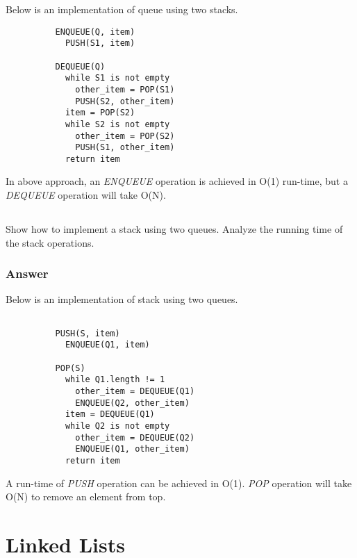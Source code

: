         Below is an implementation of queue using two stacks.

        \begin{verbatim}
          ENQUEUE(Q, item)
            PUSH(S1, item)

          DEQUEUE(Q)
            while S1 is not empty
              other_item = POP(S1)
              PUSH(S2, other_item)
            item = POP(S2)
            while S2 is not empty
              other_item = POP(S2)
              PUSH(S1, other_item)
            return item
        \end{verbatim}

        In above approach, an \textit{ENQUEUE} operation is achieved in O(1)
        run-time, but a \textit{DEQUEUE} operation will take O(N).

      \subsection{}

        Show how to implement a stack using two queues. Analyze the running
        time of the stack operations.

        \subsubsection{Answer}

        Below is an implementation of stack using two queues.

        \begin{verbatim}

          PUSH(S, item)
            ENQUEUE(Q1, item)

          POP(S)
            while Q1.length != 1
              other_item = DEQUEUE(Q1)
              ENQUEUE(Q2, other_item)
            item = DEQUEUE(Q1)
            while Q2 is not empty
              other_item = DEQUEUE(Q2)
              ENQUEUE(Q1, other_item)
            return item
        \end{verbatim}

        A run-time of \textit{PUSH} operation can be achieved in O(1).
        \textit{POP} operation will take O(N) to remove an element from top.

  \section{Linked Lists}

    \subsection{}

